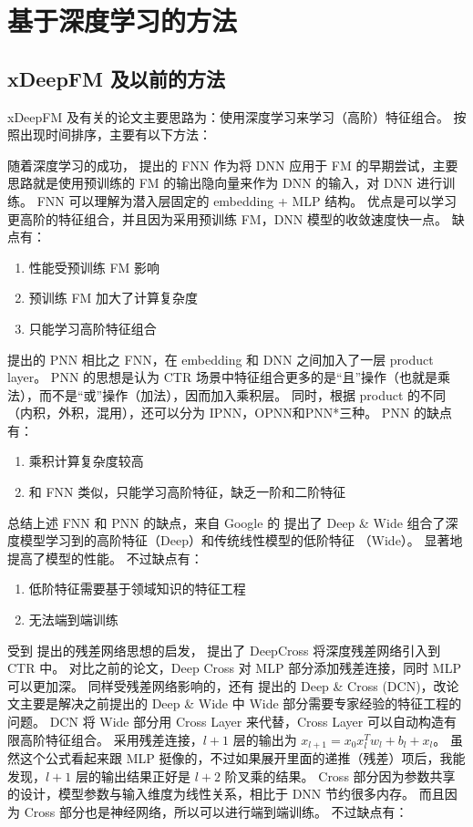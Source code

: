 \documentclass[degree=project,degree-type=project,cjk-font=noto]{thuthesis}
\begin{document}
\section{基于深度学习的方法}

\subsection{xDeepFM 及以前的方法}

xDeepFM 及有关的论文主要思路为：使用深度学习来学习（高阶）特征组合。
按照出现时间排序，主要有以下方法：

随着深度学习的成功，\cite{fnn} 提出的 FNN 作为将 DNN 应用于 FM 的早期尝试，主要思路就是使用预训练的 FM 的输出隐向量来作为 DNN 的输入，对 DNN 进行训练。
FNN 可以理解为潜入层固定的 embedding + MLP 结构。
优点是可以学习更高阶的特征组合，并且因为采用预训练 FM，DNN 模型的收敛速度快一点。
缺点有：

\begin{enumerate}
  \item 性能受预训练 FM 影响
  \item 预训练 FM 加大了计算复杂度
  \item 只能学习高阶特征组合
\end{enumerate}

\cite{pnn} 提出的 PNN 相比之 FNN，在 embedding 和 DNN 之间加入了一层 product layer。
PNN 的思想是认为 CTR 场景中特征组合更多的是“且”操作（也就是乘法），而不是“或”操作（加法），因而加入乘积层。
同时，根据 product 的不同（内积，外积，混用），还可以分为 IPNN，OPNN和PNN*三种。
PNN 的缺点有：
\begin{enumerate}
  \item 乘积计算复杂度较高
  \item 和 FNN 类似，只能学习高阶特征，缺乏一阶和二阶特征
\end{enumerate}

总结上述 FNN 和 PNN 的缺点，来自 Google 的 \cite{deep_wide} 提出了 Deep \& Wide 组合了深度模型学习到的高阶特征（Deep）和传统线性模型的低阶特征 （Wide）。
显著地提高了模型的性能。
不过缺点有：

\begin{enumerate}
  \item 低阶特征需要基于领域知识的特征工程
  \item 无法端到端训练
\end{enumerate}

受到 \cite{resnet} 提出的残差网络思想的启发，\cite{deep_cross} 提出了 DeepCross 将深度残差网络引入到 CTR 中。
对比之前的论文，Deep Cross 对 MLP 部分添加残差连接，同时 MLP 可以更加深。
同样受残差网络影响的，还有 \cite{dcn} 提出的 Deep \& Cross (DCN)，改论文主要是解决之前提出的 Deep \& Wide 中 Wide 部分需要专家经验的特征工程的问题。
DCN 将 Wide 部分用 Cross Layer 来代替，Cross Layer 可以自动构造有限高阶特征组合。
采用残差连接，$l + 1$ 层的输出为 $x_{l+1} = x_0 x_l^T w_l + b_l + x_l$。
虽然这个公式看起来跟 MLP 挺像的，不过如果展开里面的递推（残差）项后，我能发现，$l + 1 $ 层的输出结果正好是 $l + 2$ 阶叉乘的结果。
Cross 部分因为参数共享的设计，模型参数与输入维度为线性关系，相比于 DNN 节约很多内存。
而且因为 Cross 部分也是神经网络，所以可以进行端到端训练。
不过缺点有：
\end{document}
